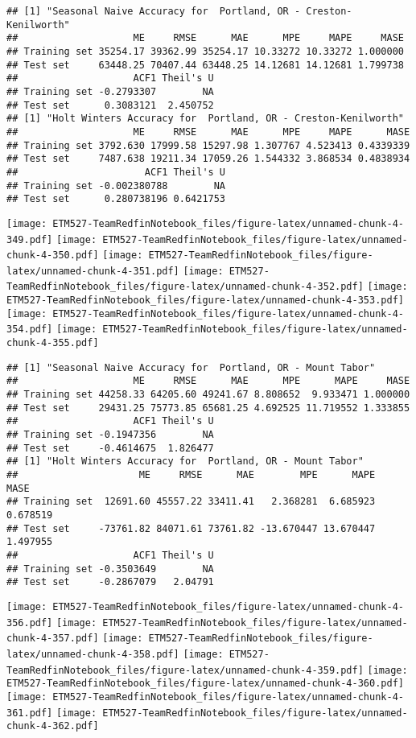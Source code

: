 \documentclass[]{article}
\begin{document}
\begin{verbatim}
## [1] "Seasonal Naive Accuracy for  Portland, OR - Creston-Kenilworth"
##                    ME     RMSE      MAE      MPE     MAPE     MASE
## Training set 35254.17 39362.99 35254.17 10.33272 10.33272 1.000000
## Test set     63448.25 70407.44 63448.25 14.12681 14.12681 1.799738
##                    ACF1 Theil's U
## Training set -0.2793307        NA
## Test set      0.3083121  2.450752
## [1] "Holt Winters Accuracy for  Portland, OR - Creston-Kenilworth"
##                    ME     RMSE      MAE      MPE     MAPE      MASE
## Training set 3792.630 17999.58 15297.98 1.307767 4.523413 0.4339339
## Test set     7487.638 19211.34 17059.26 1.544332 3.868534 0.4838934
##                      ACF1 Theil's U
## Training set -0.002380788        NA
## Test set      0.280738196 0.6421753
\end{verbatim}

\texttt{[image: ETM527-TeamRedfinNotebook\_files/figure-latex/unnamed-chunk-4-349.pdf]}
\texttt{[image: ETM527-TeamRedfinNotebook\_files/figure-latex/unnamed-chunk-4-350.pdf]}
\texttt{[image: ETM527-TeamRedfinNotebook\_files/figure-latex/unnamed-chunk-4-351.pdf]}
\texttt{[image: ETM527-TeamRedfinNotebook\_files/figure-latex/unnamed-chunk-4-352.pdf]}
\texttt{[image: ETM527-TeamRedfinNotebook\_files/figure-latex/unnamed-chunk-4-353.pdf]}
\texttt{[image: ETM527-TeamRedfinNotebook\_files/figure-latex/unnamed-chunk-4-354.pdf]}
\texttt{[image: ETM527-TeamRedfinNotebook\_files/figure-latex/unnamed-chunk-4-355.pdf]}

\begin{verbatim}
## [1] "Seasonal Naive Accuracy for  Portland, OR - Mount Tabor"
##                    ME     RMSE      MAE      MPE      MAPE     MASE
## Training set 44258.33 64205.60 49241.67 8.808652  9.933471 1.000000
## Test set     29431.25 75773.85 65681.25 4.692525 11.719552 1.333855
##                    ACF1 Theil's U
## Training set -0.1947356        NA
## Test set     -0.4614675  1.826477
## [1] "Holt Winters Accuracy for  Portland, OR - Mount Tabor"
##                     ME     RMSE      MAE        MPE      MAPE     MASE
## Training set  12691.60 45557.22 33411.41   2.368281  6.685923 0.678519
## Test set     -73761.82 84071.61 73761.82 -13.670447 13.670447 1.497955
##                    ACF1 Theil's U
## Training set -0.3503649        NA
## Test set     -0.2867079   2.04791
\end{verbatim}

\texttt{[image: ETM527-TeamRedfinNotebook\_files/figure-latex/unnamed-chunk-4-356.pdf]}
\texttt{[image: ETM527-TeamRedfinNotebook\_files/figure-latex/unnamed-chunk-4-357.pdf]}
\texttt{[image: ETM527-TeamRedfinNotebook\_files/figure-latex/unnamed-chunk-4-358.pdf]}
\texttt{[image: ETM527-TeamRedfinNotebook\_files/figure-latex/unnamed-chunk-4-359.pdf]}
\texttt{[image: ETM527-TeamRedfinNotebook\_files/figure-latex/unnamed-chunk-4-360.pdf]}
\texttt{[image: ETM527-TeamRedfinNotebook\_files/figure-latex/unnamed-chunk-4-361.pdf]}
\texttt{[image: ETM527-TeamRedfinNotebook\_files/figure-latex/unnamed-chunk-4-362.pdf]}
\end{document}
